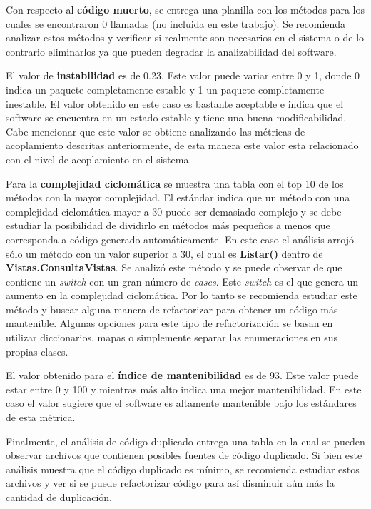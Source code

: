 Con respecto al \textbf{código muerto}, se entrega una planilla con los métodos
para los cuales se encontraron 0 llamadas (no incluida en este trabajo).
Se recomienda analizar estos métodos y verificar si realmente son
necesarios en el sistema o de lo contrario eliminarlos ya que pueden degradar
la analizabilidad del software.

El valor de \textbf{instabilidad} es de 0.23. Este valor puede variar entre
0 y 1, donde 0 indica un paquete completamente estable y 1 un paquete
completamente inestable. El valor obtenido en este caso es bastante aceptable
e indica que el software se encuentra en un estado estable y tiene una buena
modificabilidad. Cabe mencionar que este valor se obtiene analizando las
métricas de acoplamiento descritas anteriormente, de esta manera este valor
esta relacionado con el nivel de acoplamiento en el sistema.

Para la \textbf{complejidad ciclomática} se muestra una tabla con
el top 10 de los métodos con la mayor complejidad. El estándar indica
que un método con una complejidad ciclomática mayor a 30 puede
ser demasiado complejo y se debe estudiar la posibilidad de dividirlo en
métodos más pequeños a menos que corresponda a código generado automáticamente.
En este caso el análisis arrojó sólo un método con un valor superior a 30,
el cual es \textbf{Listar()} dentro de \textbf{Vistas.ConsultaVistas}.
Se analizó este método y se puede observar de que contiene un \textit{switch}
con un gran número de \textit{cases}. Este \textit{switch} es el que genera
un aumento en la complejidad ciclomática. Por lo tanto se recomienda estudiar
este método y buscar alguna manera de refactorizar para obtener un código
más mantenible. Algunas opciones para este tipo de refactorización
se basan en utilizar diccionarios, mapas o simplemente separar las enumeraciones
en sus propias clases.

El valor obtenido para el \textbf{índice de mantenibilidad} es de 93. Este
valor puede estar entre 0 y 100 y mientras más alto indica una mejor
mantenibilidad. En este caso el valor sugiere que el software es altamente
mantenible bajo los estándares de esta métrica.

Finalmente, el análisis de código duplicado entrega una tabla en la cual se
pueden observar archivos que contienen posibles fuentes de código duplicado.
Si bien este análisis muestra que el código duplicado es mínimo, se recomienda
estudiar estos archivos y ver si se puede refactorizar código para así disminuir
aún más la cantidad de duplicación.

